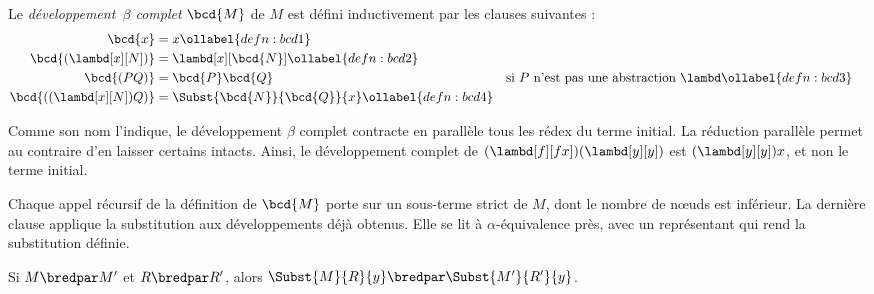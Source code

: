 \documentclass[../../../include/open-logic-section]{subfiles}
\begin{document}
\begin{defn}
Le \emph{développement~$\beta$ complet}
$\bcd{M}$ de $M$ est défini inductivement
par les clauses suivantes :
\begin{align}
  \bcd{x} &= x \ollabel{defn:bcd1} \\
  \bcd{(\lambd[x][N])}
    &= \lambd[x][\bcd{N}] \ollabel{defn:bcd2}\\
  \bcd{(PQ)} &= \bcd{P}\bcd{Q}
    && \text{si $P$ n'est pas une abstraction $\lambd$}
    \ollabel{defn:bcd3} \\
  \bcd{((\lambd[x][N])Q)}
    &= \Subst{\bcd{N}}{\bcd{Q}}{x}
    \ollabel{defn:bcd4}
\end{align}
\end{defn}

Comme son nom l'indique, le développement
$\beta$ complet contracte en parallèle
tous les rédex du terme initial. La
réduction parallèle permet au contraire
d'en laisser certains intacts. Ainsi, le
développement complet de
$(\lambd[f][fx])(\lambd[y][y])$ est
$(\lambd[y][y])x$, et non le terme initial.

Chaque appel récursif de la définition de $\bcd{M}$
porte sur un sous-terme strict de $M$, dont le nombre
de nœuds est inférieur. La dernière clause applique
la substitution aux développements déjà obtenus.
Elle se lit à $\alpha$-équivalence près, avec un
représentant qui rend la substitution définie.

\begin{lem}
Si $M \bredpar M'$ et $R \bredpar R'$,
alors $\Subst{M}{R}{y} \bredpar
\Subst{M'}{R'}{y}$.
\end{lem}
\end{document}
